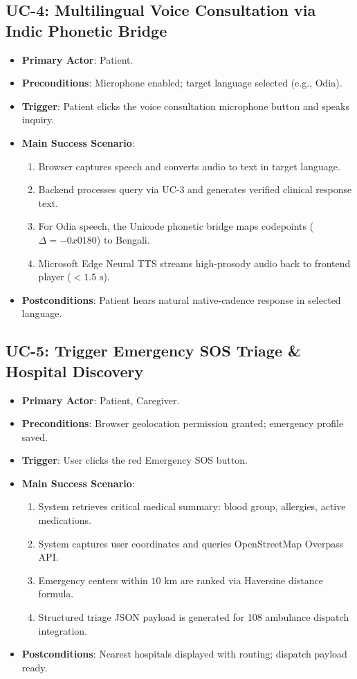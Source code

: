 \subsection{UC-4: Multilingual Voice Consultation via Indic Phonetic Bridge}
\begin{itemize}
    \item \textbf{Primary Actor}: Patient.
    \item \textbf{Preconditions}: Microphone enabled; target language selected (e.g., Odia).
    \item \textbf{Trigger}: Patient clicks the voice consultation microphone button and speaks inquiry.
    \item \textbf{Main Success Scenario}:
    \begin{enumerate}
        \item Browser captures speech and converts audio to text in target language.
        \item Backend processes query via UC-3 and generates verified clinical response text.
        \item For Odia speech, the Unicode phonetic bridge maps codepoints ($\Delta = -0x0180$) to Bengali.
        \item Microsoft Edge Neural TTS streams high-prosody audio back to frontend player ($<1.5\text{ s}$).
    \end{enumerate}
    \item \textbf{Postconditions}: Patient hears natural native-cadence response in selected language.
\end{itemize}

\subsection{UC-5: Trigger Emergency SOS Triage \& Hospital Discovery}
\begin{itemize}
    \item \textbf{Primary Actor}: Patient, Caregiver.
    \item \textbf{Preconditions}: Browser geolocation permission granted; emergency profile saved.
    \item \textbf{Trigger}: User clicks the red Emergency SOS button.
    \item \textbf{Main Success Scenario}:
    \begin{enumerate}
        \item System retrieves critical medical summary: blood group, allergies, active medications.
        \item System captures user coordinates and queries OpenStreetMap Overpass API.
        \item Emergency centers within $10\text{ km}$ are ranked via Haversine distance formula.
        \item Structured triage JSON payload is generated for 108 ambulance dispatch integration.
    \end{enumerate}
    \item \textbf{Postconditions}: Nearest hospitals displayed with routing; dispatch payload ready.
\end{itemize}

